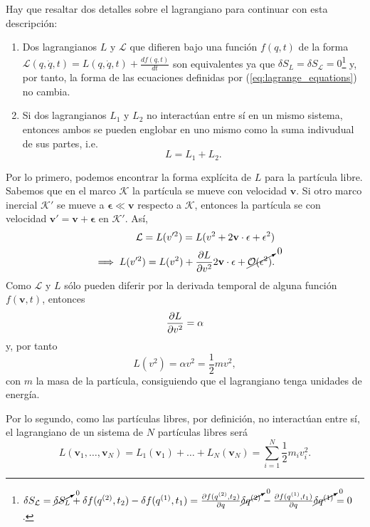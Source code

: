Hay que resaltar dos detalles sobre el lagrangiano para continuar con esta descripción:
\begin{enumerate}

  \item Dos lagrangianos $L$ y $\mathcal{L}$ que difieren bajo una función $f(q,t)$ de la forma $\mathcal{L}(q,\dot{q},t) = L(q,\dot{q},t) + \frac{d f(q,t)}{dt}$ son equivalentes ya que $\delta S_{L} = \delta S_{\mathcal{L}} = 0$\footnote{$ \delta S_{\mathcal{L}} = \cancelto{0}{\delta S_L} + \delta f(q^{(2)},t_2) - \delta f(q^{(1)},t_1) = \frac{\partial f(q^{(2)},t_2)}{\partial q} \cancelto{0}{ \delta q^{(2)} } - \frac{\partial f(q^{(1)},t_1)}{\partial q} \cancelto{0}{ \delta q^{(1)} } = 0$.} y, por tanto, la forma de las ecuaciones definidas por (\ref{eq:lagrange_equations}) no cambia.

 \item Si dos lagrangianos $L_1$ y $L_2$ no interactúan entre sí en un mismo sistema, entonces ambos se pueden englobar en uno mismo como la suma indivudual de sus partes, i.e.
 \begin{equation}
  L = L_1 + L_2 .
  \label{eq:lagrangian_addititivy}
 \end{equation}
 
\end{enumerate}

Por lo primero, podemos encontrar la forma explícita de $L$ para la partícula libre. Sabemos que en el marco $\mathcal{K}$ la partícula se mueve con velocidad $\mathbf{v}$. Si otro marco inercial $\mathcal{K}'$ se mueve a $\mathbf{\epsilon} \ll \mathbf{v}$ respecto a $\mathcal{K}$, entonces la partícula se con velocidad $\mathbf{v}' = \mathbf{v} + \mathbf{\epsilon}$ en $\mathcal{K}'$. Así,
\begin{align*}
 \mathcal{L} = L(v'^2) = L(v^2 + 2 \mathbf{v} \cdot \mathbf{\epsilon} + \epsilon^2) \\
 \implies  L(v'^2) = L(v^2) + \frac{\partial L}{\partial v^2} 2 \mathbf{v} \cdot \mathbf{\epsilon} + \cancelto{0}{\mathcal{O}(\epsilon^2)}.
\end{align*}
Como $\mathcal{L}$ y $L$ sólo pueden diferir por la derivada temporal de alguna función $f(\mathbf{v},t)$, entonces
\begin{align*}
 \frac{\partial L}{\partial v^2} = \alpha
\end{align*}
y, por tanto
\begin{equation}
 L(v^2) = \alpha v^2 = \frac{1}{2}m v^2,
\end{equation}
con $m$ la masa de la partícula, consiguiendo que el lagrangiano tenga unidades de energía.

Por lo segundo, como las partículas libres, por definición, no interactúan entre sí, el lagrangiano de un sistema de $N$ partículas libres será
\begin{equation}
 L(\mathbf{v}_1, \ldots, \mathbf{v}_N) = L_1(\mathbf{v}_1) + \ldots + L_N(\mathbf{v}_N) = \sum_{i=1}^N \frac{1}{2}m_i v_i^2.
 \label{eq:free_part_lagrangian}
\end{equation}